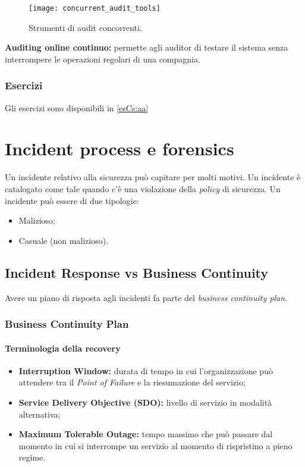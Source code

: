 \begin{figure}[h!]
        \begin{center}
                \texttt{[image: concurrent\_audit\_tools]}
        \end{center}
        \caption{Strumenti di audit concorrenti.}
        \label{fig:concurrent:audit:tools}
\end{figure}

\noindent \textbf{Auditing online continuo:} permette agli auditor di
testare il sistema senza interrompere le operazioni regolari di una
compagnia.

\section{Esercizi}

Gli esercizi sono disponibili in \ref{esCs:aa}

\part{Incident process e forensics}

Un incidente relativo alla sicurezza può capitare per molti motivi. Un
incidente è catalogato come tale quando c'è una violazione della
\textit{policy} di sicurezza. Un incidente può essere di due tipologie:
\begin{itemize}
\item Malizioso;
\item Casuale (non malizioso).
\end{itemize}

\chapter{Incident Response vs Business Continuity}
\label{IRBC}

Avere un piano di risposta agli incidenti fa parte del \textit{business
continuity plan}.

\section{Business Continuity Plan}

\subsection{Terminologia della recovery}

\begin{itemize}
\item \textbf{Interruption Window:} durata di tempo in cui l'organizzazione
può attendere tra il \textit{Point of Failure} e la riesumazione del servizio;
\item \textbf{Service Delivery Objective (SDO):} livello di servizio in
modalità alternativa;
\item \textbf{Maximum Tolerable Outage:} tempo massimo che può passare dal
momento in cui si interrompe un servizio al momento di rispristino a pieno
regime.
\end{itemize}

